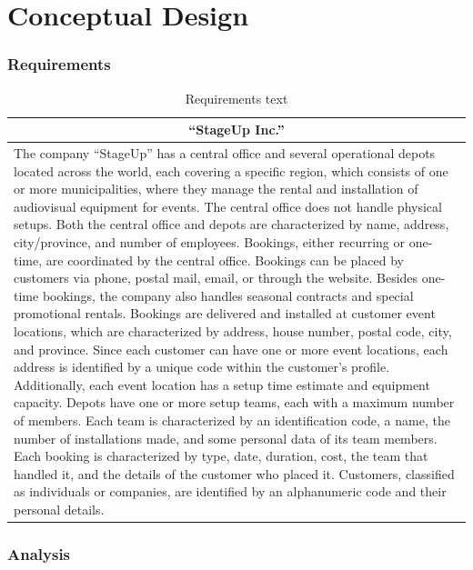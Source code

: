 \chapter{Conceptual Design}

\subsection{Requirements}

\begin{table}[H]
    \renewcommand{\arraystretch}{1.25}
    \begin{tabularx}{\textwidth}{|X|}
    \hline
    \multicolumn{1}{|c|}{\textbf{``StageUp Inc.''}} \\
    \hline
    The company ``StageUp'' has a central office and several operational depots located across the world, each covering a specific region, which consists of one or more municipalities, where they manage the rental and installation of audiovisual equipment for events. The central office does not handle physical setups. Both the central office and depots are characterized by name, address, city/province, and number of employees. Bookings, either recurring or one-time, are coordinated by the central office. Bookings can be placed by customers via phone, postal mail, email, or through the website. Besides one-time bookings, the company also handles seasonal contracts and special promotional rentals. Bookings are delivered and installed at customer event locations, which are characterized by address, house number, postal code, city, and province. Since each customer can have one or more event locations, each address is identified by a unique code within the customer's profile. Additionally, each event location has a setup time estimate and equipment capacity. Depots have one or more setup teams, each with a maximum number of members. Each team is characterized by an identification code, a name, the number of installations made, and some personal data of its team members. Each booking is characterized by type, date, duration, cost, the team that handled it, and the details of the customer who placed it. Customers, classified as individuals or companies, are identified by an alphanumeric code and their personal details. \\
    \hline
    \end{tabularx}
    \caption{Requirements text}
\end{table}

\subsection{Analysis}

